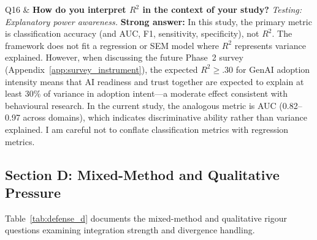 \begin{xltabular}
Q16 & \textbf{How do you interpret $R^2$ in the context of your study?} \newline
\textit{Testing: Explanatory power awareness.} \newline\newline
\textbf{Strong answer:} In this study, the primary metric is classification accuracy (and AUC, F1, sensitivity, specificity), not $R^2$. The framework does not fit a regression or SEM model where $R^2$ represents variance explained. However, when discussing the future Phase~2 survey (Appendix~\ref{app:survey_instrument}), the expected $R^2 \geq .30$ for GenAI adoption intensity means that AI readiness and trust together are expected to explain at least 30\% of variance in adoption intent---a moderate effect consistent with behavioural research. In the current study, the analogous metric is AUC (0.82--0.97 across domains), which indicates discriminative ability rather than variance explained. I am careful not to conflate classification metrics with regression metrics. \\

\end{xltabular}

\subsection{Section D: Mixed-Method and Qualitative Pressure}

\noindent Table~\ref{tab:defense_d} documents the mixed-method and qualitative rigour questions examining integration strength and divergence handling.

